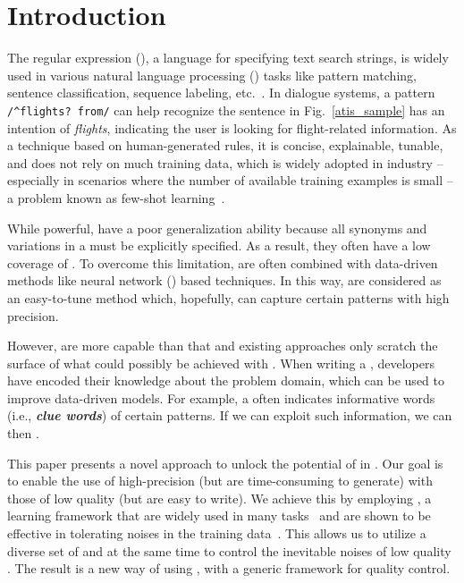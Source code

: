 \section{Introduction}


The regular expression (\RE), a language for specifying text search strings, is widely used in various natural language processing (\NLP)
tasks like pattern matching, sentence classification, sequence labeling, etc.~\cite{chang2014tokensregex}. In dialogue systems, a \RE
pattern \texttt{/\textasciicircum flights? from/} can help recognize the sentence in Fig.~\ref{atis_sample} has an intention of
\emph{flights}, indicating the user is looking for flight-related information. As a technique based on human-generated rules, it is
concise, explainable, tunable, and does not rely on much training data, which is widely adopted in industry -- especially in scenarios
where the number of available training examples is small -- a problem known as few-shot learning~\cite{gc2015big}.

While powerful, \REs have a poor generalization ability because all synonyms and variations in a \RE must be explicitly specified. As a
result, they often have a low coverage of . To overcome this limitation, \REs are often combined with data-driven methods like neural
network (\NN) based techniques. In this way, \REs are considered as an easy-to-tune method which, hopefully, can capture certain patterns
with high precision.

However, \REs are more capable than that and existing approaches only scratch the surface of what could possibly be achieved with \REs.
When writing a \RE, developers have encoded their knowledge about the problem domain, which can be used to improve data-driven models. For
example, a \RE often indicates informative words (i.e., \textbf{\textit{clue words}}) of certain patterns. If we can exploit such
information, we can then .

This paper presents a novel approach to unlock the potential of \REs in \NLP. Our goal is to enable the use of high-precision \REs (but are
time-consuming to generate) with those of low quality (but are easy to write). We achieve this by employing \NNs, a learning framework that
are widely used in many \NLP tasks~\cite{goldberg2017neural} and are shown to be effective in tolerating noises in the training
data~\cite{xie2016disturblabel}. This allows us to utilize a diverse set of \REs and at the same time to control the inevitable noises of
 low quality \REs. The result is a new way of using \REs, with a generic framework for quality control.

